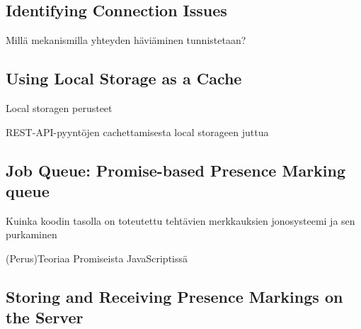 




\subsection{Identifying Connection Issues}
Millä mekanismilla yhteyden häviäminen tunnistetaan?




\subsection{Using Local Storage as a Cache}
Local storagen perusteet

REST-API-pyyntöjen cachettamisesta local storageen juttua



\subsection{Job Queue: Promise-based Presence Marking queue}
Kuinka koodin tasolla on toteutettu tehtävien merkkauksien jonosysteemi ja sen purkaminen

(Perus)Teoriaa Promiseista JavaScriptissä


\subsection{Storing and Receiving Presence Markings on the Server}







